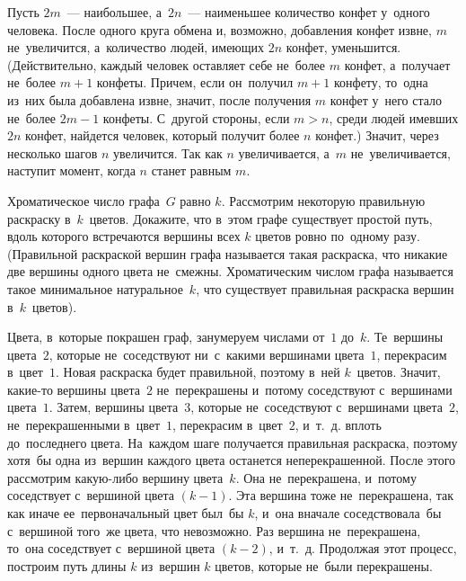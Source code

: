 \ifincludesolutions
Пусть $2 m$~--- наибольшее, а~$2 n$~--- наименьшее количество
конфет у~одного человека.
После одного круга обмена и, возможно, добавления конфет извне, $m$
не~увеличится, а~количество людей, имеющих $2 n$ конфет, уменьшится.
(Действительно, каждый человек оставляет себе не~более $m$ конфет, а~получает
не~более $m + 1$ конфеты.
Причем, если он~получил $m + 1$ конфету, то~одна из~них была добавлена извне,
значит, после получения $m$ конфет у~него стало не~более $2 m - 1$ конфеты.
С~другой стороны, если $m > n$, среди людей имевших $2 n$ конфет, найдется
человек, который получит более $n$ конфет.)
Значит, через несколько шагов $n$ увеличится.
Так как $n$ увеличивается, а~$m$ не~увеличивается, наступит момент, когда $n$
станет равным $m$.
\fi %

\begin{problems}

\item
Хроматическое число графа~$G$ равно $k$.
Рассмотрим некоторую правильную раскраску в~$k$~цветов.
Докажите, что в~этом графе существует простой путь, вдоль которого встречаются
вершины всех $k$ цветов ровно по~одному разу.
(Правильной раскраской вершин графа называется такая раскраска, что никакие две
вершины одного цвета не~смежны.
Хроматическим числом графа называется такое минимальное натуральное~$k$, что
существует правильная раскраска вершин в~$k$~цветов).

\end{problems}

\ifincludesolutions
Цвета, в~которые покрашен граф, занумеруем числами от~$1$ до~$k$.
Те~вершины цвета~$2$, которые не~соседствуют ни~с~какими вершинами цвета~$1$,
перекрасим в~цвет~$1$.
Новая раскраска будет правильной, поэтому в~ней $k$~цветов.
Значит, какие-то вершины цвета~$2$ не~перекрашены и~потому соседствуют
с~вершинами цвета~$1$.
Затем, вершины цвета~$3$, которые не~соседствуют с~вершинами цвета~$2$,
не~перекрашенными в~цвет~$1$, перекрасим в~цвет~$2$, и~т.~д. вплоть
до~последнего цвета.
На~каждом шаге получается правильная раскраска, поэтому хотя~бы одна из~вершин
каждого цвета останется неперекрашенной.
После этого рассмотрим какую-либо вершину цвета~$k$.
Она не~перекрашена, и~потому соседствует с~вершиной цвета $(k - 1)$.
Эта вершина тоже не~перекрашена, так как иначе ее~первоначальный цвет был~бы
$k$, и~она вначале соседствовала~бы с~вершиной того~же цвета, что невозможно.
Раз вершина не~перекрашена, то~она соседствует с~вершиной цвета $(k - 2)$,
и~т.~д. Продолжая этот процесс, построим путь длины $k$ из~вершин $k$ цветов,
которые не~были перекрашены.
\fi %

